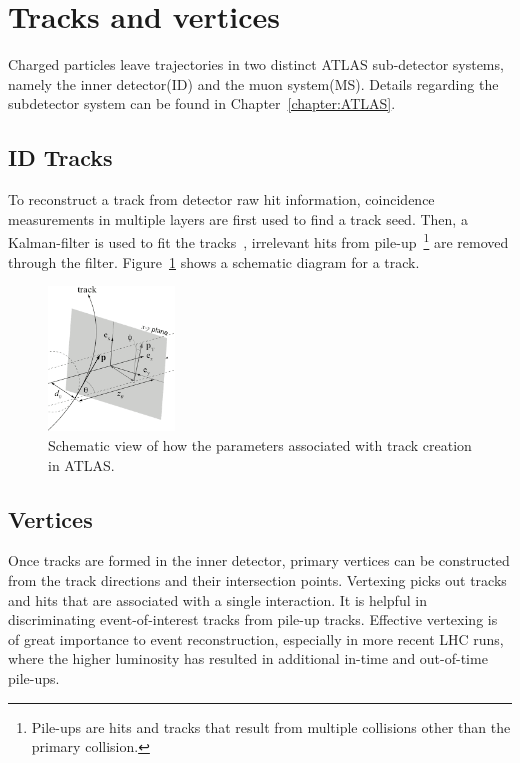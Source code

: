 \section{Tracks and vertices}
\label{sec:Tracks}
Charged particles leave trajectories in two distinct ATLAS sub-detector systems, namely the inner detector(ID) and the muon system(MS). Details regarding the subdetector system can be found in Chapter~\ref{chapter:ATLAS}.

\subsection{ID Tracks}
To reconstruct a track from detector raw hit information, coincidence measurements in multiple layers are first used to find a track seed. Then, a Kalman-filter is used to fit the tracks~\cite{track}, irrelevant hits from pile-up~\footnote{Pile-ups are hits and tracks that result from multiple collisions other than the primary collision. } are removed through the filter. Figure~\ref{fig:track} shows a schematic diagram for a track.

\begin{figure}[!htb]
    \begin{center}
        \includegraphics[width=0.3\textwidth]{figures/common_ana/Track}
        \caption{ 
        Schematic view of how the parameters associated with track creation in ATLAS.
        }
        \label{fig:track}
    \end{center}
\end{figure}

\subsection{Vertices}
Once tracks are formed in the inner detector, primary vertices can be constructed from the track directions and their intersection points. Vertexing picks out tracks and hits that are associated with a single interaction. It is helpful in discriminating event-of-interest tracks from pile-up tracks. Effective vertexing is of great importance to event reconstruction, especially in more recent LHC runs, where the higher luminosity has resulted in additional in-time and out-of-time pile-ups.


